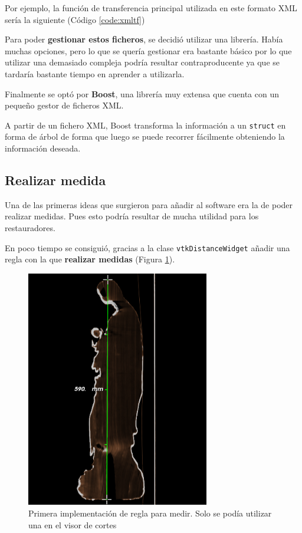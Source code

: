 Por ejemplo, la función de transferencia principal utilizada en este formato XML sería la siguiente (Código \ref{code:xmltf})



Para poder \textbf{gestionar estos ficheros}, se decidió utilizar una librería. Había muchas opciones, pero lo que se quería gestionar era bastante básico por lo que utilizar una demasiado compleja podría resultar contraproducente ya que se tardaría bastante tiempo en aprender a utilizarla.

Finalmente se optó por \textbf{Boost}, una librería muy extensa que cuenta con un pequeño gestor de ficheros XML. 

A partir de un fichero XML, Boost transforma la información a un \texttt{struct} en forma de árbol de forma que luego se puede recorrer fácilmente obteniendo la información deseada.

\subsection{Realizar medida}

Una de las primeras ideas que surgieron para añadir al software era la de poder realizar medidas. Pues esto podría resultar de mucha utilidad para los restauradores.

En poco tiempo se consiguió, gracias a la clase \texttt{vtkDistanceWidget} añadir una regla con la que \textbf{realizar medidas} (Figura \ref{fig:primera_regla}).

\begin{figure}[H]
	\centering
	\includegraphics[width=8cm]{imagenes/primera_regla}
	\caption{Primera implementación de regla para medir. Solo se podía utilizar una en el visor de cortes}
	\label{fig:primera_regla}
\end{figure}


